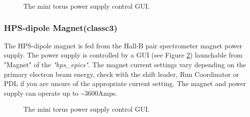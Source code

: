\documentclass[12pt]{article}
\begin{document}
\begin{figure}[tbhp]
\caption{The mini torus power supply control GUI. \label{fig:minit}}
\end{figure}


\subsubsection{HPS-dipole Magnet(classc3)\label{pair_spectrometer}}

The HPS-dipole magnet is fed from the Hall-B pair spectrometer magnet power supply. The power supply is controlled by a GUI (see Figure \ref{pairspecgui})
launchable from "Magnet" of the \emph{"hps\_epics"}. The magnet current
settings vary depending on the primary electron beam energy,
check with the shift leader, Run Coordinator or PDL if you are unsure of the
appropriate current setting. The magnet and power supply can operate up to \~{}3600Amps.

\begin{figure}[tbhp]
\caption{The mini torus power supply control GUI. \label{pairspecgui}}
\end{figure}
\end{document}
